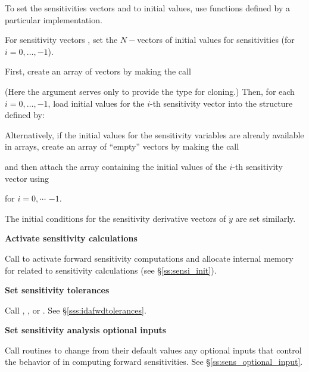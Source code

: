 \begin{Steps}
  To set the sensitivities vectors  and  to initial values,
  use functions defined by a particular {\nvector} implementation. 

  For sensitivity vectors , set the  $N-$vectors 
   of initial values for sensitivities (for $i=0,\ldots,$$-1$). 

  First, create an array of  vectors by making the call


  (Here the argument  serves only to provide the  type
  for cloning.)  Then, for each $i=0,\ldots,$$-1$, load initial values
  for the $i$-th sensitivity vector into the structure defined by:


  Alternatively, if the initial values for the sensitivity variables are already
  available in  arrays, create an array of  ``empty'' vectors
  by making the call


  and then attach the  array  containing the initial values
  of the $i$-th sensitivity vector using


  for $i = 0,\cdots$  $-1$.

  The initial conditions for the  sensitivity derivative vectors 
  of $\dot{y}$ are set similarly.

\item
  {\bf Activate sensitivity calculations}

  Call \id{(\ldots);} to activate forward 
  sensitivity computations and allocate internal memory for {\idas} related 
  to sensitivity calculations (see \S\ref{ss:sensi_init}).

\item
  {\bf Set sensitivity tolerances}

  Call , , or .
  See \S\ref{sss:idafwdtolerances}.

\item
  {\bf Set sensitivity analysis optional inputs}

  Call  routines to change from their default values any
  optional inputs that control the behavior of {\idas} in computing forward 
  sensitivities.  See \S\ref{ss:sens_optional_input}.


\end{Steps}
